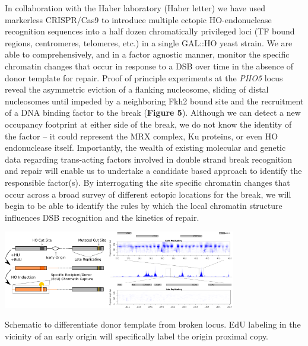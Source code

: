 In collaboration with the Haber laboratory (Haber letter) we have used markerless CRISPR/Cas9\cite{Dekker2017} to introduce multiple ectopic HO-endonuclease recognition sequences into a half dozen chromatically privileged loci (TF bound regions, centromeres, telomeres, etc.) in a single GAL::HO yeast strain.  %
We are able to comprehensively, and in a factor agnostic manner, monitor the specific chromatin changes that occur in response to a DSB over time in the absence of donor template for repair.  Proof of principle experiments at the \textit{PHO5} locus reveal the asymmetric eviction of a flanking nucleosome, sliding of distal nucleosomes until impeded by a neighboring Fkh2 bound site and the recruitment of a DNA binding factor to the break ({\color{dukeblue}\textbf{Figure 5}}).  Although we can detect a new occupancy footprint at either side of the  break, we do not know the identity of the factor -- it could represent the MRX complex, Ku proteins, or even HO endonuclease itself. Importantly, the wealth of existing molecular and genetic data regarding trans-acting factors involved in double strand break recognition and repair %
will enable us to undertake a %
candidate based approach to identify the responsible factor(s).  By interrogating the site specific chromatin changes that occur across a broad survey of different ectopic locations for the break, we will begin to be able to identify the rules by which the local chromatin structure influences DSB recognition and the kinetics of repair.
\begin{floatingfigure}[l]{4in}
\vspace{-7mm}
\begin{center}
\includegraphics[width=4in]{r35_figures/EdU_Schematic_9.png}
\end{center}
\vspace{4mm}
\caption{Schematic to differentiate donor template from broken locus. EdU labeling in the vicinity of an early origin will specifically label the origin proximal copy. }%
\end{floatingfigure}


